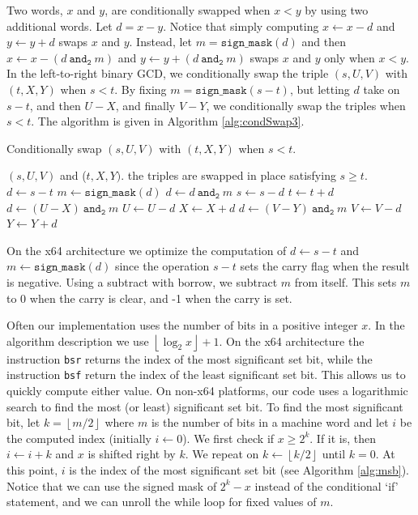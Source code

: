 \documentclass{ucalgthes1}
\theoremstyle{definition}
\newcommand{\floor}[1]{\left\lfloor #1 \right\rfloor}
\newcommand{\band}{~\texttt{and}_\texttt{2}~}
\begin{document}
Two words, $x$ and $y$, are conditionally swapped when $x < y$ by using two additional words.  Let $d = x - y$.  Notice that simply computing $x \gets x - d$ and $y \gets y + d$ swaps $x$ and $y$.  Instead, let $m = \texttt{sign\_mask}(d)$ and then  $x \gets x - (d \band m)$ and $y \gets y + (d \band m)$ swaps $x$ and $y$ only when $x < y$.  In the left-to-right binary GCD, we conditionally swap the triple $(s, U, V)$ with $(t, X, Y)$ when $s < t$.  By fixing $m = \texttt{sign\_mask}(s - t)$, but letting $d$ take on $s - t$, and then $U - X$, and finally $V - Y$, we conditionally swap the triples when $s < t$. The algorithm is given in Algorithm \ref{alg:condSwap3}.
\begin{algorithm}[htb]
\caption{Conditionally swap $(s, U, V)$ with $(t, X, Y)$ when $s < t$.}
\label{alg:condSwap3}
\begin{algorithmic}[1]
\Require $(s, U, V)$ and ($t, X, Y)$.
\Ensure the triples are swapped in place satisfying $s \ge t$.
\State $d \gets s - t$
\State $m \gets \texttt{sign\_mask}(d)$
\State $d \gets d \band m$
\State $s \gets s - d$
\State $t \gets t + d$
\State $d \gets (U - X) \band m$
\State $U \gets U - d$
\State $X \gets X + d$
\State $d \gets (V - Y) \band m$
\State $V \gets V - d$
\State $Y \gets Y + d$
\end{algorithmic}
\end{algorithm}
On the x64 architecture we optimize the computation of $d \gets s - t$ and $m \gets \texttt{sign\_mask}(d)$ since the operation $s-t$ sets the carry flag when the result is negative.  Using a subtract with borrow, we subtract $m$ from itself.  This sets $m$ to 0 when the carry is clear, and -1 when the carry is set.

Often our implementation uses the number of bits in a positive integer $x$.  In the algorithm description we use $\floor{\log_2x} + 1$.  On the x64 architecture the instruction \texttt{bsr} returns the index of the most significant set bit, while the instruction \texttt{bsf} return the index of the least significant set bit.  This allows us to quickly compute either value.  On non-x64 platforms, our code uses a logarithmic search to find the most (or least) significant set bit.  To find the most significant bit, let $k = \floor{m/2}$ where $m$ is the number of bits in a machine word and let $i$ be the computed index (initially $i \gets 0$).  We first check if $x \ge 2^k$.  If it is, then $i \gets i + k$ and $x$ is shifted right by $k$.  We repeat on $k \gets \floor{k/2}$ until $k=0$.  At this point, $i$ is the index of the most significant set bit (see Algorithm \ref{alg:msb}).  Notice that we can use the signed mask of $2^k - x$ instead of the conditional `if' statement, and we can unroll the while loop for fixed values of $m$.
\end{document}
